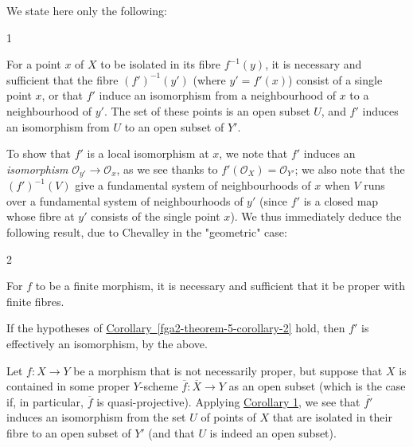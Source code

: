   We state here only the following:\begin{corollary}{1}\label{fga2-theorem-5-corollary-1}\skipsinglepar\par{}For a point \(x\) of \(X\) to be isolated in its fibre \(f^{-1}(y)\), it is necessary and sufficient that the fibre \((f')^{-1}(y')\) (where \(y'=f'(x)\)) consist of a single point \(x\), or that \(f'\) induce an isomorphism from a neighbourhood of \(x\) to a neighbourhood of \(y'\).
    The set of these points is an open subset \(U\), and \(f'\) induces an isomorphism from \(U\) to an open subset of \(Y'\).\end{corollary}\par{}To show that \(f'\) is a local isomorphism at \(x\), we note that \(f'\) induces an \emph{isomorphism} \(\mathcal {O}_{y'}\to \mathcal {O}_x\), as we see thanks to \(f'(\mathcal {O}_X)=\mathcal {O}_{Y'}\);
  we also note that the \((f')^{-1}(V)\) give a fundamental system of neighbourhoods of \(x\) when \(V\) runs over a fundamental system of neighbourhoods of \(y'\) (since \(f'\) is a closed map whose fibre at \(y'\) consists of the single point \(x\)).
  We thus immediately deduce the following result, due to Chevalley in the "geometric" case:\begin{corollary}{2}\label{fga2-theorem-5-corollary-2}\skipsinglepar\par{}For \(f\) to be a finite morphism, it is necessary and sufficient that it be proper with finite fibres.\end{corollary}\par{}If the hypotheses of \hyperref[fga2-theorem-5-corollary-2]{Corollary~\ref*{fga2-theorem-5-corollary-2}} hold, then \(f'\) is effectively an isomorphism, by the above.\par{}Let \(f\colon  X\to  Y\) be a morphism that is not necessarily proper, but suppose that \(X\) is contained in some proper \(Y\)-scheme \(\overline {f}\colon \overline {X}\to  Y\) as an open subset (which is the case if, in particular, \(\overline {f}\) is quasi-projective).
  Applying \hyperref[fga2-theorem-5-corollary-1]{Corollary 1}, we see that \(\overline {f'}\) induces an isomorphism from the set \(U\) of points of \(X\) that are isolated in their fibre to an open subset of \(Y'\) (and that \(U\) is indeed an open subset).
